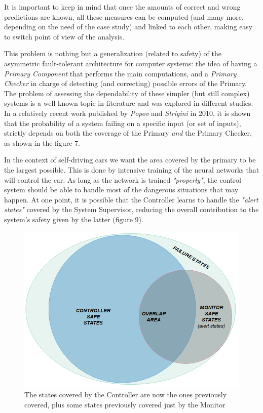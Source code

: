 It is important to keep in mind that once the amounts of correct and wrong predictions are known, all these measures can be computed (and many more, depending on the need of the case study) and linked to each other, making easy to switch point of view of the analysis.\newline

This problem is nothing but a generalization (related to safety) of the asymmetric fault-tolerant architecture for computer systems: the idea of having a \textsl{Primary Component} that performs the main computations, and a \textsl{Primary Checker} in charge of detecting (and correcting) possible errors of the Primary.\newline
The problem of assessing the dependability of these simpler (but still complex) systems is a well known topic in literature and was explored in different studies. In a relatively recent work published by \textsl{Popov} and \textsl{Strigini} in 2010, it is shown that the probability of a system failing on a specific input (or set of inputs), strictly depends on both the coverage of the Primary \textsl{and} the Primary Checker, as shown in the figure 7.\cite{striginiPopov}

In the context of self-driving cars we want the area covered by the primary to be the largest possible. This is done by intensive training of the neural networks that will control the car. As long as the network is trained \textsl{"properly"}, the control system should be able to handle most of the dangerous situations that may happen. At one point, it is possible that the Controller learns to handle the \textsl{"alert states"} covered by the System Supervisor, reducing the overall contribution to the system's safety given by the latter (figure 9).

\begin{figure}[h!]
	\includegraphics[width=\textwidth]{img/area-growth-good.png}
	\caption{The states covered by the Controller are now the ones previously covered, plus some states previously covered just by the Monitor}
\end{figure}

